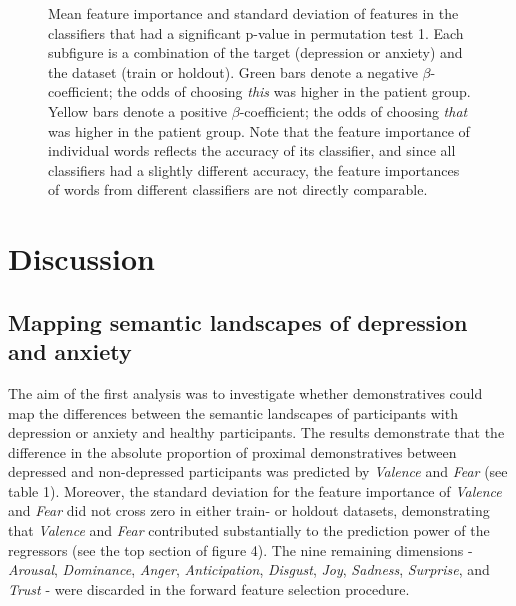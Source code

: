 \documentclass[11pt, a4paper]{article}
\begin{document}
\begin{figure}
\centering
\vspace{-0.7cm}

\caption{\label{fig:data} Mean feature importance and standard deviation of features in the classifiers that had a significant p-value in permutation test 1. Each subfigure is a combination of the target (depression or anxiety) and the dataset (train or holdout). Green bars denote a negative $\beta$-coefficient; the odds of choosing \textit{this} was higher in the patient group. Yellow bars denote a positive $\beta$-coefficient; the odds of choosing \textit{that} was higher in the patient group. Note that the feature importance of individual words reflects the accuracy of its classifier, and since all classifiers had a slightly different accuracy, the feature importances of words from different classifiers are not directly comparable. 
}
\end{figure}


\newpage

\section{Discussion}
\subsection{Mapping semantic landscapes of depression and anxiety}
The aim of the first analysis was to investigate whether demonstratives could map the differences between the semantic landscapes of participants with depression or anxiety and healthy participants. The results demonstrate that the difference in the absolute proportion of proximal demonstratives between depressed and non-depressed participants was predicted by \textit{Valence} and \textit{Fear} (see table 1). Moreover, the standard deviation for the feature importance of \textit{Valence} and \textit{Fear} did not cross zero in either train- or holdout datasets, demonstrating that \textit{Valence} and \textit{Fear} contributed substantially to the prediction power of the regressors (see the top section of figure 4). The nine remaining dimensions - \textit{Arousal}, \textit{Dominance}, \textit{Anger}, \textit{Anticipation}, \textit{Disgust}, \textit{Joy}, \textit{Sadness}, \textit{Surprise}, and \textit{Trust} - were discarded in the forward feature selection procedure. \\
\end{document}

